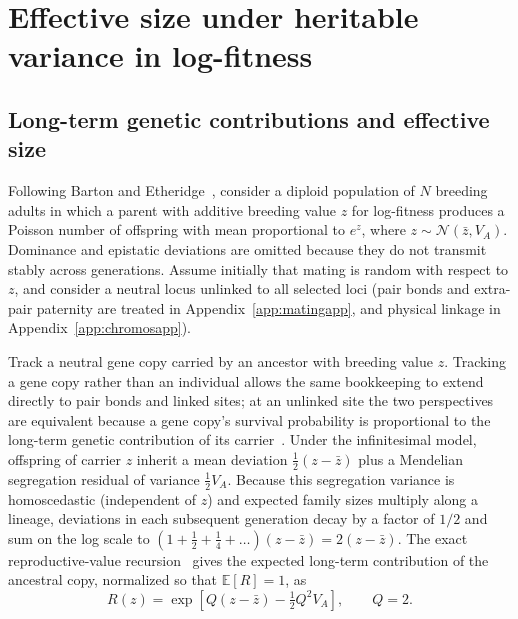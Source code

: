 \documentclass{article}
\begin{document}
    \linenumbers
    \appendix
\fi

\section{Effective size under heritable variance in log-fitness}\label{app:unlinkedapp}

\subsection{Long-term genetic contributions and effective size}\label{app:B_R}
Following Barton and Etheridge~\cite{barton2011}, consider a diploid population of $N$ breeding adults in which a parent with additive breeding value $z$ for log-fitness produces a Poisson number of offspring with mean proportional to $e^{z}$, where $z \sim \mathcal{N}(\bar{z}, V_A)$. Dominance and epistatic deviations are omitted because they do not transmit stably across generations. Assume initially that mating is random with respect to $z$, and consider a neutral locus unlinked to all selected loci (pair bonds and extra-pair paternity are treated in Appendix~\ref{app:matingapp}, and physical linkage in Appendix~\ref{app:chromosapp}).

Track a neutral gene copy carried by an ancestor with breeding value $z$. Tracking a gene copy rather than an individual allows the same bookkeeping to extend directly to pair bonds and linked sites; at an unlinked site the two perspectives are equivalent because a gene copy's survival probability is proportional to the long-term genetic contribution of its carrier~\cite{barton2011}. Under the infinitesimal model, offspring of carrier $z$ inherit a mean deviation $\tfrac12(z - \bar{z})$ plus a Mendelian segregation residual of variance $\tfrac12 V_A$. Because this segregation variance is homoscedastic (independent of $z$) and expected family sizes multiply along a lineage, deviations in each subsequent generation decay by a factor of $1/2$ and sum on the log scale to $(1 + \tfrac12 + \tfrac14 + \dots)(z - \bar{z}) = 2(z - \bar{z})$. The exact reproductive-value recursion~\cite[Appendix~B]{barton2011} gives the expected long-term contribution of the ancestral copy, normalized so that $\mathbb{E}[R] = 1$, as
\begin{equation}
    R(z) = \exp\left[Q(z - \bar{z}) - \tfrac12 Q^2V_A\right], \qquad Q = 2. \label{eq:B_R}
\end{equation}
\end{document}
